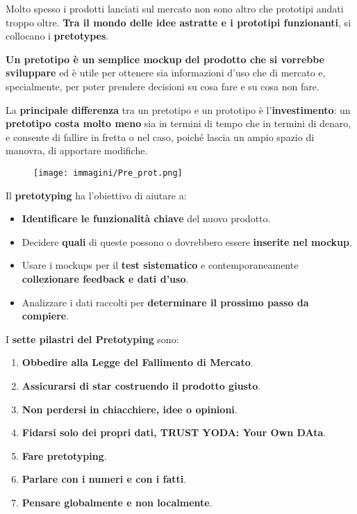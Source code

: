 Molto spesso i prodotti lanciati sul mercato non sono altro che prototipi andati troppo oltre. \textbf{Tra il mondo delle idee astratte e i prototipi funzionanti}, si collocano i \textbf{pretotypes}.

\textbf{Un pretotipo è un semplice mockup del prodotto che si vorrebbe sviluppare} ed è utile per ottenere sia informazioni d'uso che di mercato e, specialmente, per poter prendere decisioni su cosa fare e su cosa non fare.

La \textbf{principale differenza} tra un pretotipo e un prototipo è l'\textbf{investimento}: un \textbf{pretotipo costa molto meno} sia in termini di tempo che in termini di denaro, e consente di fallire in fretta o nel caso, poiché lascia un ampio spazio di manovra, di apportare modifiche.

\pagebreak

\begin{figure}[!h]
	\centering
	\texttt{[image: immagini/Pre\_prot.png]}
\end{figure}

Il \textbf{pretotyping} ha l'obiettivo di aiutare a:

\begin{itemize}
	\item \textbf{Identificare le funzionalità chiave} del nuovo prodotto.
	\item Decidere \textbf{quali} di queste possono o dovrebbero essere \textbf{inserite nel mockup}.
	\item Usare i mockups per il \textbf{test sistematico} e contemporaneamente \textbf{collezionare feedback e dati d'uso}.
	\item Analizzare i dati raccolti per \textbf{determinare il prossimo passo da compiere}.
\end{itemize}

I \textbf{sette pilastri del Pretotyping} sono:

\begin{enumerate}
	\item \textbf{Obbedire alla Legge del Fallimento di Mercato}.
	\item \textbf{Assicurarsi di star costruendo il prodotto giusto}.
	\item \textbf{Non perdersi in chiacchiere, idee o opinioni}.
	\item \textbf{Fidarsi solo dei propri dati, \textbf{TRUST YODA: Your Own DAta}}.
	\item \textbf{Fare pretotyping}.
	\item \textbf{Parlare con i numeri e con i fatti}.
	\item \textbf{Pensare globalmente e non localmente}.
\end{enumerate}

